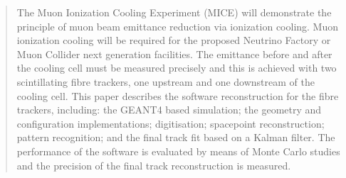 \begin{quotation}

\noindent
The Muon Ionization Cooling Experiment (MICE) will demonstrate the principle of muon beam emittance reduction via ionization cooling.  Muon ionization cooling will be required for the proposed Neutrino Factory or Muon Collider next generation facilities.  The emittance before and after the cooling cell must be measured precisely and this is achieved with two scintillating fibre trackers, one upstream and one downstream of the cooling cell.  This paper describes the software reconstruction for the fibre trackers, including: the GEANT4 based simulation; the geometry and configuration implementations; digitisation; spacepoint reconstruction; pattern recognition; and the final track fit based on a Kalman filter. The performance of the software is evaluated by means of Monte Carlo studies and the precision of the final track reconstruction is measured.

\end{quotation}
